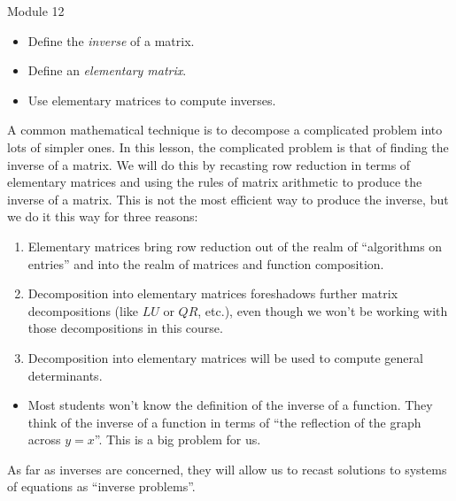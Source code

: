 \documentclass{workbook}
\begin{document}
\begin{lesson}

	Module 12

	\begin{itemize}
		\item Define the \emph{inverse} of a matrix.
		\item Define an \emph{elementary matrix}.
		\item Use elementary matrices to compute inverses.
	\end{itemize}

	A common mathematical technique is to decompose a complicated problem into lots of simpler ones.
	In this lesson, the complicated problem is that of finding the inverse of a matrix. We will do this
	by recasting row reduction in terms of elementary matrices and using the rules of matrix arithmetic
	to produce the inverse of a matrix. This is not the most efficient way to produce the inverse, but we
	do it this way for three reasons:
	\begin{enumerate}
		\item Elementary matrices bring row reduction out of the realm of ``algorithms on entries'' and into
			the realm of matrices and function composition.
		\item Decomposition into elementary matrices foreshadows further matrix decompositions (like $LU$ or $QR$, etc.),
			even though we won't be working with those decompositions in this course.
		\item Decomposition into elementary matrices will be used to compute general determinants.
	\end{enumerate}


	\begin{annotation}
		\begin{notes}
			\begin{itemize}
				\item Most students won't know the definition of the inverse of a function.
					They think of the inverse of a function in terms of ``the reflection of the graph
					across $y=x$''. This is a big problem for us.
			\end{itemize}
		\end{notes}
	\end{annotation}
	As far as inverses are concerned, they will allow us to recast solutions to systems of equations as ``inverse problems''.


\end{lesson}
\end{document}

